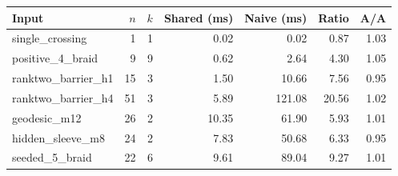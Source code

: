 \begin{tabular}{lrrrrrr}
\toprule
Input & $n$ & $k$ & Shared (ms) & Naive (ms) & Ratio & A/A \\
\midrule
single\_crossing & 1 & 1 & 0.02 & 0.02 & 0.87 & 1.03 \\
positive\_4\_braid & 9 & 9 & 0.62 & 2.64 & 4.30 & 1.05 \\
ranktwo\_barrier\_h1 & 15 & 3 & 1.50 & 10.66 & 7.56 & 0.95 \\
ranktwo\_barrier\_h4 & 51 & 3 & 5.89 & 121.08 & 20.56 & 1.02 \\
geodesic\_m12 & 26 & 2 & 10.35 & 61.90 & 5.93 & 1.01 \\
hidden\_sleeve\_m8 & 24 & 2 & 7.83 & 50.68 & 6.33 & 0.95 \\
seeded\_5\_braid & 22 & 6 & 9.61 & 89.04 & 9.27 & 1.01 \\
\bottomrule
\end{tabular}

